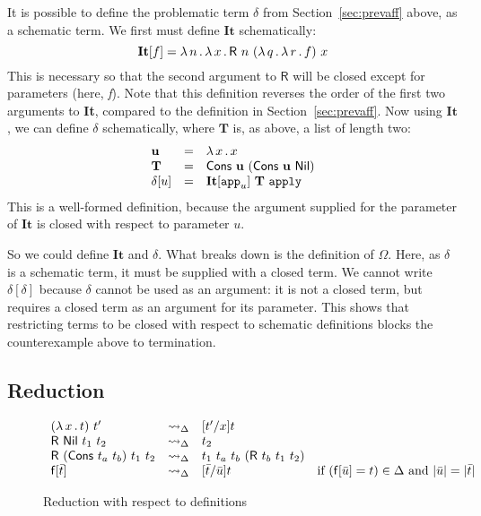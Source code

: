 \documentclass{article}
\begin{document}
It is possible to define the problematic term $\delta$ from
Section~\ref{sec:prevaff} above, as a schematic term.  We first
must define $\mathbf{It}$ schematically:
\[
\mathbf{It}[f] = \lambda\, n\, .\, \lambda\, x\, .\, \mathsf{R}\ n\ (\lambda\, q\, .\, \lambda\, r\, .\, f)\ x
\]
\noindent This is necessary so that the second argument to $\mathsf{R}$ will
be closed except for parameters (here, \textit{f}).  Note that this definition
reverses the order of the first two arguments to \textbf{It}, compared to the definition
in Section~\ref{sec:prevaff}.  Now using $\mathbf{It}$,
we can define $\delta$ schematically, where $\mathbf{T}$ is, as above, a list of length two:
\[
\begin{array}{lll}
\mathbf{u} & = & \lam{x}{x} \\
  \mathbf{T} & = & \mathsf{Cons}\ \mathbf{u}\ (\mathsf{Cons}\ \mathbf{u}\ \mathsf{Nil}) \\
  \delta[u] & = & \mathbf{It}[\texttt{app}_u]\ \mathbf{T}\ \texttt{apply}
\end{array}
\]
\noindent This is a well-formed definition, because the argument supplied for
the parameter of $\mathbf{It}$ is closed with respect to parameter $u$.

So we could define $\mathbf{It}$ and $\delta$.  What breaks down is
the definition of $\Omega$.  Here, as $\delta$ is a schematic term, it
must be supplied with a closed term.  We cannot write $\delta[\delta]$
because $\delta$ cannot be used as an argument: it is not a closed
term, but requires a closed term as an argument for its parameter.
This shows that restricting terms to be closed with respect to
schematic definitions blocks the counterexample above to termination.

\subsection{Reduction}

\begin{figure}
  \[
  \begin{array}{llll}
    (\lam{x}{t})\ t' & \leadsto_\Delta & [t'/x]t &\ \\
    \mathsf{R}\ \mathsf{Nil}\ t_1\ t_2 & \leadsto_\Delta & t_2 &\ \\
    \mathsf{R}\ (\mathsf{Cons}\ t_a\ t_b)\ t_1\ t_2 & \leadsto_\Delta & t_1\ t_a\ t_b\ (\mathsf{R}\ t_b\ t_1\ t_2) &\ \\
    \mathsf{f}[\bar{t}] & \leadsto_\Delta & [\bar{t}/\bar{u}]t & \textnormal{if }(\mathsf{f}[\bar{u}] = t) \in \Delta \textnormal{ and }
    |\bar{u}| = |\bar{t}|
  \end{array}
  \]
  \caption{Reduction with respect to definitions}
  \label{fig:sarred}
\end{figure}
\end{document}
